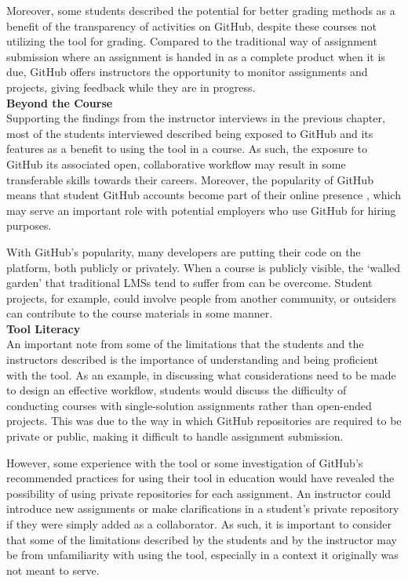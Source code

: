 Moreover, some students described the potential for better grading methods as a benefit of the transparency of activities on GitHub, despite these courses not utilizing the tool for grading. Compared to the traditional way of assignment submission where an assignment is handed in as a complete product when it is due, GitHub offers instructors the opportunity to monitor assignments and projects, giving feedback while they are in progress. \\

\textbf{Beyond the Course} \\
Supporting the findings from the instructor interviews in the previous chapter, most of the students interviewed described being exposed to GitHub and its features as a benefit to using the tool in a course. As such, the exposure to GitHub its associated open, collaborative workflow may result in some transferable skills towards their careers. Moreover, the popularity of GitHub means that student GitHub accounts become part of their online presence \cite{treude2012programming}, which may serve an important role with potential employers who use GitHub for hiring purposes.

With GitHub's popularity, many developers are putting their code on the platform, both publicly or privately. When a course is publicly visible, the `walled garden' that traditional LMSs tend to suffer from \cite{mott2010envisioning} can be overcome. Student projects, for example, could involve people from another community, or outsiders can contribute to the course materials in some manner. \\

\textbf{Tool Literacy} \\
An important note from some of the limitations that the students and the instructors described is the importance of understanding and being proficient with the tool. As an example, in discussing what considerations need to be made to design an effective workflow, students would discuss the difficulty of conducting courses with single-solution assignments rather than open-ended projects. This was due to the way in which GitHub repositories are required to be private or public, making it difficult to handle assignment submission.

However, some experience with the tool or some investigation of GitHub's recommended practices for using their tool in education would have revealed the possibility of using private repositories for each assignment. An instructor could introduce new assignments or make clarifications in a student's private repository if they were simply added as a collaborator. As such, it is important to consider that some of the limitations described by the students and by the instructor may be from unfamiliarity with using the tool, especially in a context it originally was not meant to serve.

